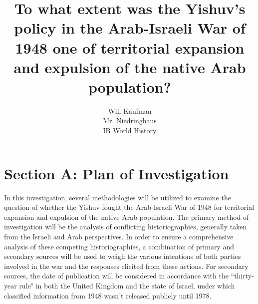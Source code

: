 \documentclass[12pt]{turabian-researchpaper}
\begin{document}
\title{To what extent was the Yishuv's policy in the Arab-Israeli War of 1948 one of territorial expansion and expulsion of the native Arab population?}

\author{Will Kaufman \\ Mr. Niedringhaus \\ IB World History}
\maketitle



\section{Section A: Plan of Investigation}
In this investigation, several methodologies will be utilized to examine the question of whether the Yishuv fought the Arab-Israeli War of 1948 for territorial expansion and expulsion of the native Arab population.  The primary method of investigation will be the analysis of conflicting historiographies, generally taken from the Israeli and Arab perspectives.  In order to ensure a comprehensive analysis of these competing historiographies, a combination of primary and secondary sources will be used to weigh the various intentions of both parties involved in the war and the responses elicited from these actions.  For secondary sources, the date of publication will be considered in accordance with the ``thirty-year rule" in both the United Kingdom and the state of Israel, under which classified information from 1948 wasn’t released publicly until 1978.

\end{document}
